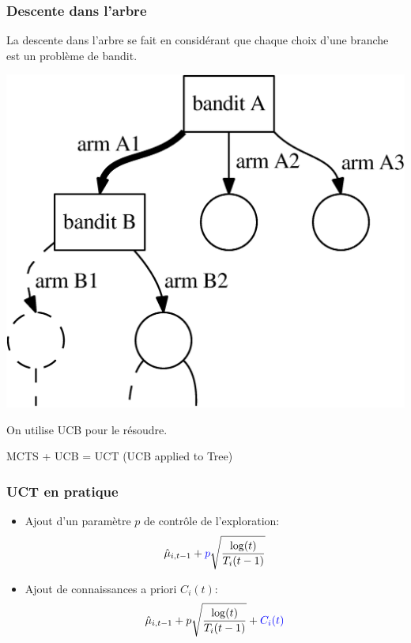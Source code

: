 \documentclass[compress, color = usenames, dvipsnames]{beamer}
\begin{document}
\begin{frame}
    \frametitle{Descente dans l'arbre}
    La descente dans l'arbre se fait en considérant que chaque choix d'une branche est un problème de bandit.

    \begin{center}
        \includegraphics[scale=0.5]{figs/bandit_cascade.png}
    \end{center}

    On utilise UCB pour le résoudre.

    MCTS + UCB = UCT (UCB applied to Tree)

    \hfill \cite{kocsis2006bandit}

\end{frame}

\begin{frame}
    \frametitle{UCT en pratique}
    \begin{itemize}
        \item Ajout d'un paramètre $p$ de contrôle de l'exploration:
            $$ \hat{\mu}_{i,t-1} + {\color{blue}p} \sqrt{\frac{\log(t)}{T_i(t-1)}} $$
        \item Ajout de connaissances a priori $C_i(t)$:
            $$ \hat{\mu}_{i,t-1} + p \sqrt{\frac{\log(t)}{T_i(t-1)}} + {\color{blue} C_i(t)} $$
    \end{itemize}
    
\end{frame}
\end{document}

